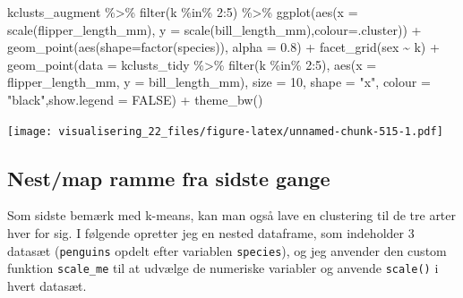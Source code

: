 \documentclass[
]{book}
\newenvironment{Shaded}{\begin{snugshade}}{\end{snugshade}}
\newcommand{\AttributeTok}[1]{\textcolor[rgb]{0.77,0.63,0.00}{#1}}
\newcommand{\ConstantTok}[1]{\textcolor[rgb]{0.00,0.00,0.00}{#1}}
\newcommand{\DecValTok}[1]{\textcolor[rgb]{0.00,0.00,0.81}{#1}}
\newcommand{\FloatTok}[1]{\textcolor[rgb]{0.00,0.00,0.81}{#1}}
\newcommand{\FunctionTok}[1]{\textcolor[rgb]{0.00,0.00,0.00}{#1}}
\newcommand{\NormalTok}[1]{#1}
\newcommand{\SpecialCharTok}[1]{\textcolor[rgb]{0.00,0.00,0.00}{#1}}
\newcommand{\StringTok}[1]{\textcolor[rgb]{0.31,0.60,0.02}{#1}}
\begin{document}
\begin{Shaded}
\begin{Highlighting}[]
\NormalTok{kclusts\_augment }\SpecialCharTok{\%\textgreater{}\%} \FunctionTok{filter}\NormalTok{(k }\SpecialCharTok{\%in\%} \DecValTok{2}\SpecialCharTok{:}\DecValTok{5}\NormalTok{) }\SpecialCharTok{\%\textgreater{}\%} 
  \FunctionTok{ggplot}\NormalTok{(}\FunctionTok{aes}\NormalTok{(}\AttributeTok{x =} \FunctionTok{scale}\NormalTok{(flipper\_length\_mm), }\AttributeTok{y =} \FunctionTok{scale}\NormalTok{(bill\_length\_mm),}\AttributeTok{colour=}\NormalTok{.cluster)) }\SpecialCharTok{+}
        \FunctionTok{geom\_point}\NormalTok{(}\FunctionTok{aes}\NormalTok{(}\AttributeTok{shape=}\FunctionTok{factor}\NormalTok{(species)), }\AttributeTok{alpha =} \FloatTok{0.8}\NormalTok{) }\SpecialCharTok{+} 
        \FunctionTok{facet\_grid}\NormalTok{(sex }\SpecialCharTok{\textasciitilde{}}\NormalTok{ k) }\SpecialCharTok{+} 
        \FunctionTok{geom\_point}\NormalTok{(}\AttributeTok{data =}\NormalTok{ kclusts\_tidy }\SpecialCharTok{\%\textgreater{}\%} \FunctionTok{filter}\NormalTok{(k }\SpecialCharTok{\%in\%} \DecValTok{2}\SpecialCharTok{:}\DecValTok{5}\NormalTok{),}
                   \FunctionTok{aes}\NormalTok{(}\AttributeTok{x =}\NormalTok{ flipper\_length\_mm,}
                       \AttributeTok{y =}\NormalTok{ bill\_length\_mm), }
                   \AttributeTok{size =} \DecValTok{10}\NormalTok{, }\AttributeTok{shape =} \StringTok{"x"}\NormalTok{, }\AttributeTok{colour =} \StringTok{"black"}\NormalTok{,}\AttributeTok{show.legend =} \ConstantTok{FALSE}\NormalTok{) }\SpecialCharTok{+}
        \FunctionTok{theme\_bw}\NormalTok{()}
\end{Highlighting}
\end{Shaded}

\texttt{[image: visualisering\_22\_files/figure-latex/unnamed-chunk-515-1.pdf]}

\hypertarget{nestmap-ramme-fra-sidste-gange}{%
\subsection{Nest/map ramme fra sidste gange}\label{nestmap-ramme-fra-sidste-gange}}

Som sidste bemærk med k-means, kan man også lave en clustering til de tre arter hver for sig. I følgende opretter jeg en nested dataframe, som indeholder 3 datasæt (\texttt{penguins} opdelt efter variablen \texttt{species}), og jeg anvender den custom funktion \texttt{scale\_me} til at udvælge de numeriske variabler og anvende \texttt{scale()} i hvert datasæt.
\end{document}
